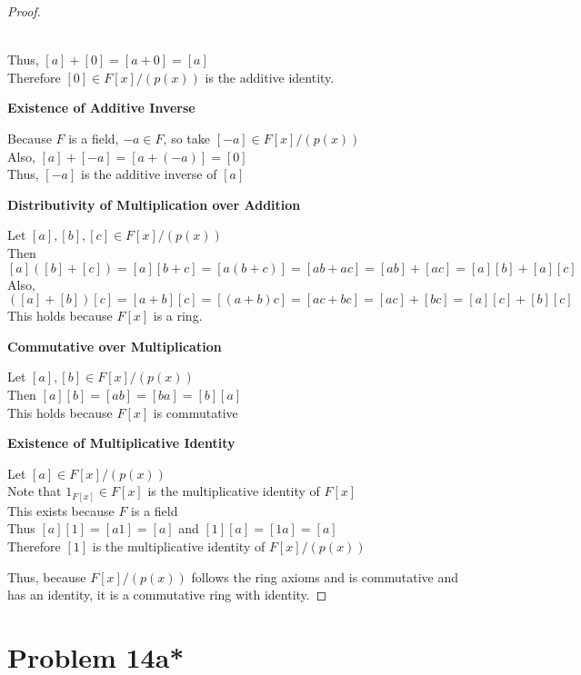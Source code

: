 \documentclass{article} %
\begin{document}
\begin{addmargin}[1em]{0em}
\begin{proof}
\begin{addmargin}[1em]{0em}
\\Thus, $[a] + [0] = [a + 0] = [a]$
\\Therefore $[0] \in F[x]/(p(x))$ is the additive identity.
\end{addmargin}
\textbf{Existence of Additive Inverse}
\begin{addmargin}[1em]{0em}
Because $F$ is a field, $-a \in F$, so take $[-a] \in F[x]/(p(x))$
\\Also, $[a] + [-a] = [a + (-a)] = [0]$
\\Thus, $[-a]$ is the additive inverse of $[a]$
\end{addmargin}
\textbf{Distributivity of Multiplication over Addition}
\begin{addmargin}[1em]{0em}
Let $[a], [b], [c] \in F[x]/(p(x))$
\\Then $[a]([b] + [c]) = [a][b + c] = [a(b + c)] = [ab + ac] = [ab] + [ac] = [a][b] + [a][c]$
\\Also, $([a] + [b])[c] = [a + b][c] = [(a + b)c] = [ac + bc] = [ac] + [bc] = [a][c] + [b][c]$
\\This holds because $F[x]$ is a ring.
\end{addmargin}
\textbf{Commutative over Multiplication}
\begin{addmargin}[1em]{0em}
Let $[a],[b] \in F[x]/(p(x))$
\\Then $[a][b] = [ab] = [ba] = [b][a]$
\\This holds because $F[x]$ is commutative
\end{addmargin}
\textbf{Existence of Multiplicative Identity}
\begin{addmargin}[1em]{0em}
Let $[a] \in F[x]/(p(x))$
\\Note that $1_{F[x]} \in F[x]$ is the multiplicative identity of $F[x]$
\\This exists because $F$ is a field
\\Thus $[a][1] = [a1] = [a]$ and $[1][a] = [1a] = [a]$
\\Therefore $[1]$ is the multiplicative identity of $F[x]/(p(x))$
\end{addmargin}
Thus, because $F[x]/(p(x))$ follows the ring axioms and is commutative and has an identity, it is a commutative ring with identity.
\end{proof}
\end{addmargin}

\newpage

\section*{Problem 14a*}
\end{document}
